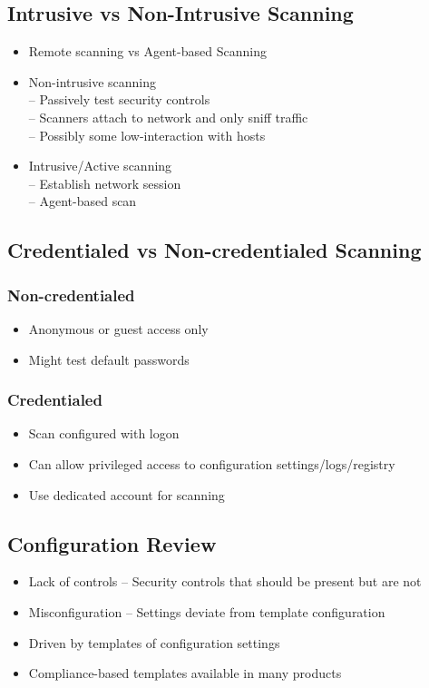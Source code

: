 	\subsection {Intrusive vs Non-Intrusive Scanning}
		\begin{itemize}
			\item Remote scanning vs Agent-based Scanning
			\item Non-intrusive scanning \\
				-- Passively test security controls \\
				-- Scanners attach to network and only sniff traffic \\
				-- Possibly some low-interaction with hosts
			\item Intrusive/Active scanning \\
				-- Establish network session \\
				-- Agent-based scan
		\end{itemize}
	\subsection {Credentialed vs Non-credentialed Scanning}
		\subsubsection {Non-credentialed}
			\begin{itemize}
				\item Anonymous or guest access only
				\item Might test default passwords
			\end{itemize}
		\subsubsection {Credentialed}
			\begin{itemize}
				\item Scan configured with logon
				\item Can allow privileged access to configuration settings/logs/registry
				\item Use dedicated account for scanning
			\end{itemize}
	\subsection {Configuration Review}
		\begin{itemize}
			\item Lack of controls -- Security controls that should be present but are not
			\item Misconfiguration -- Settings deviate from template configuration
			\item Driven by templates of configuration settings
			\item Compliance-based templates available in many products
		\end{itemize}
